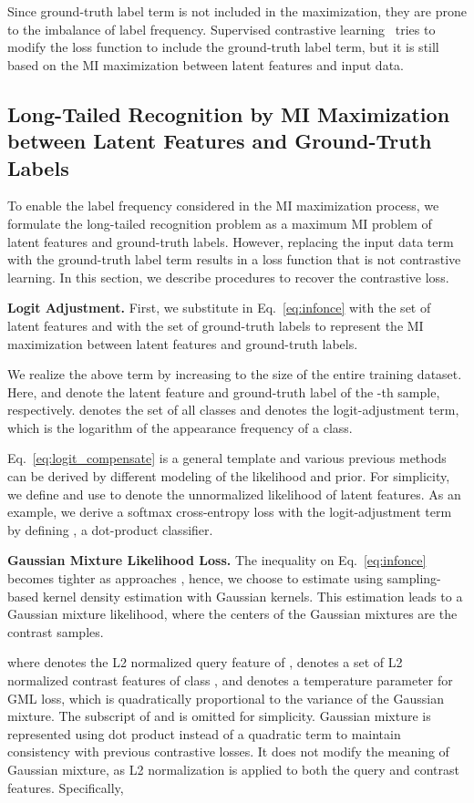 \documentclass{article}
\theoremstyle{plain}
\theoremstyle{definition}
\theoremstyle{remark}
\begin{document}
Since ground-truth label term is not included in the maximization, they are prone to the imbalance of label frequency. Supervised contrastive learning~\cite{khosla2020supervised} tries to modify the loss function to include the ground-truth label term, but it is still based on the MI maximization between latent features and input data.

\subsection{Long-Tailed Recognition by MI Maximization between Latent Features and Ground-Truth Labels} \label{sec:proposed_formulation}
To enable the label frequency considered in the MI maximization process, we formulate the long-tailed recognition problem as a maximum MI problem of latent features and ground-truth labels. However, replacing the input data term with the ground-truth label term results in a loss function that is not contrastive learning. In this section, we describe procedures to recover the contrastive loss.

\textbf{Logit Adjustment.} 
First, we substitute  in Eq.~\ref{eq:infonce} with the set of latent features and  with the set of ground-truth labels to represent the MI maximization between latent features and ground-truth labels.

We realize the above term by increasing  to the size of the entire training dataset. Here,  and  denote the latent feature and ground-truth label of the -th sample, respectively.  denotes the set of all classes and  denotes the logit-adjustment term, which is the logarithm of the appearance frequency of a class.

Eq.~\ref{eq:logit_compensate} is a general template and various previous methods can be derived by different modeling of the likelihood and prior. For simplicity, we define  and use  to denote the unnormalized likelihood of latent features. As an example, we derive a softmax cross-entropy loss with the logit-adjustment term by defining , a dot-product classifier.

\textbf{Gaussian Mixture Likelihood Loss.} The inequality on Eq.~\ref{eq:infonce} becomes tighter as  approaches , hence, we choose to estimate  using sampling-based kernel density estimation with Gaussian kernels. This estimation leads to a Gaussian mixture likelihood, where the centers of the Gaussian mixtures are the contrast samples.

where  denotes the L2 normalized query feature of ,  denotes a set of L2 normalized contrast features of class , and  denotes a temperature parameter for GML loss, which is quadratically proportional to the variance of the Gaussian mixture. The subscript  of  and  is omitted for simplicity. Gaussian mixture is represented using dot product instead of a quadratic term to maintain consistency with previous contrastive losses. It does not modify the meaning of Gaussian mixture, as L2 normalization is applied to both the query and contrast features. Specifically,
\end{document}
